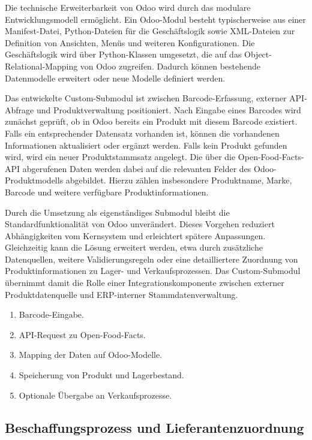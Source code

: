 \documentclass[12pt,a4paper]{article}
\begin{document}
Die technische Erweiterbarkeit von Odoo wird durch das modulare Entwicklungsmodell ermöglicht. Ein Odoo-Modul besteht typischerweise aus einer Manifest-Datei, Python-Dateien für die Geschäftslogik sowie XML-Dateien zur Definition von Ansichten, Menüs und weiteren Konfigurationen.\autocite{odoo2026orm} Die Geschäftslogik wird über Python-Klassen umgesetzt, die auf das Object-Relational-Mapping von Odoo zugreifen. Dadurch können bestehende Datenmodelle erweitert oder neue Modelle definiert werden.\autocite{odoo2026orm}

Das entwickelte Custom-Submodul ist zwischen Barcode-Erfassung, externer API-Abfrage und Produktverwaltung positioniert. Nach Eingabe eines Barcodes wird zunächst geprüft, ob in Odoo bereits ein Produkt mit diesem Barcode existiert. Falls ein entsprechender Datensatz vorhanden ist, können die vorhandenen Informationen aktualisiert oder ergänzt werden. Falls kein Produkt gefunden wird, wird ein neuer Produktstammsatz angelegt. Die über die Open-Food-Facts-API abgerufenen Daten werden dabei auf die relevanten Felder des Odoo-Produktmodells abgebildet. Hierzu zählen insbesondere Produktname, Marke, Barcode und weitere verfügbare Produktinformationen.

Durch die Umsetzung als eigenständiges Submodul bleibt die Standardfunktionalität von Odoo unverändert. Dieses Vorgehen reduziert Abhängigkeiten vom Kernsystem und erleichtert spätere Anpassungen. Gleichzeitig kann die Lösung erweitert werden, etwa durch zusätzliche Datenquellen, weitere Validierungsregeln oder eine detailliertere Zuordnung von Produktinformationen zu Lager- und Verkaufsprozessen. Das Custom-Submodul übernimmt damit die Rolle einer Integrationskomponente zwischen externer Produktdatenquelle und ERP-interner Stammdatenverwaltung.


\begin{enumerate}
  \item Barcode-Eingabe.
  \item API-Request zu Open-Food-Facts.
  \item Mapping der Daten auf Odoo-Modelle.
  \item Speicherung von Produkt und Lagerbestand.
  \item Optionale Übergabe an Verkaufsprozesse.
\end{enumerate}

  \subsection{Beschaffungsprozess und Lieferantenzuordnung}
\end{document}
